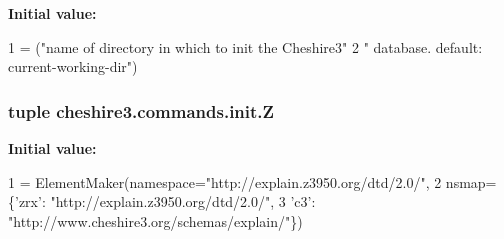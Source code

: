 {\bfseries Initial value\-:}
\begin{DoxyCode}
1 = (\textcolor{stringliteral}{"name of directory in which to init the Cheshire3"}
2                              \textcolor{stringliteral}{" database. default: current-working-dir"})
\end{DoxyCode}
\hypertarget{namespacecheshire3_1_1commands_1_1init_a46a746677a1666b09f023b43925873f9}{
\subsubsection[{Z}]{\setlength{\rightskip}{0pt plus 5cm}tuple cheshire3.\-commands.\-init.\-Z}}\label{namespacecheshire3_1_1commands_1_1init_a46a746677a1666b09f023b43925873f9}
{\bfseries Initial value\-:}
\begin{DoxyCode}
1 = ElementMaker(namespace=\textcolor{stringliteral}{"http://explain.z3950.org/dtd/2.0/"},
2                   nsmap=\{\textcolor{stringliteral}{'zrx'}: \textcolor{stringliteral}{"http://explain.z3950.org/dtd/2.0/"},
3                          \textcolor{stringliteral}{'c3'}: \textcolor{stringliteral}{"http://www.cheshire3.org/schemas/explain/"}\})
\end{DoxyCode}
